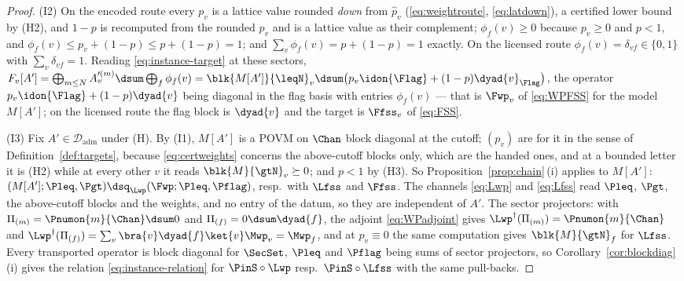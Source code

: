\begin{proof}
(I2) On the encoded route every $p_v$ is a lattice value rounded
\emph{down} from $\hat p_v$ (\eqref{eq:weightroute}, \eqref{eq:latdown}), a
certified lower bound by (H2), and $1-p$ is recomputed from the rounded
$p_v$ and is a lattice value as their complement; $\phi_f(v)\ge0$ because
$p_v\ge0$ and $p<1$, and $\phi_f(v)\le p_v+(1-p)\le p+(1-p)=1$; and
$\sum_v\phi_f(v)=p+(1-p)=1$ exactly. On the licensed route
$\phi_f(v)=\delta_{vf}\in\{0,1\}$ with $\sum_v\delta_{vf}=1$. Reading
\eqref{eq:instance-target} at these sectors,
$F_v[A']=\bigoplus_{m\le N}A'^{(m)}_v\dsum\bigoplus_{f}\phi_f(v)
=\blk{M[A']}{\leqN}_v\dsum\big(p_v\idon{\Flag}+(1-p)\dyad{v}_{\Flag}\big)$,
the operator $p_v\idon{\Flag}+(1-p)\dyad{v}$ being diagonal in the flag basis
with entries $\phi_f(v)$ --- that is $\Fwp_v$ of \eqref{eq:WPFSS} for the
model $M[A']$; on the licensed route the flag block is $\dyad{v}$ and the
target is $\Ffss_v$ of \eqref{eq:FSS}.

(I3) Fix $A'\in\mathcal{D}_{\mathrm{adm}}$ under (H). By (I1), $M[A']$ is a
POVM on $\Chan$ block diagonal at the cutoff; $(p_v)$ are 
for it in the sense of Definition~\ref{def:targets}, because
\eqref{eq:certweights} concerns the above-cutoff blocks only, which are the
handed ones, and at a bounded letter it is (H2) while at every other $v$ it
reads $\blk{M}{\gtN}_v\succeq0$; and $p<1$ by (H3). So
Proposition~\ref{prop:chain}\,(i) applies to $M[A']$:
$(M[A'];\Pleq,\Pgt)\dsq_{\Lwp}(\Fwp;\Pleq,\Pflag)$, resp.\ with $\Lfss$ and
$\Ffss$. The channels \eqref{eq:Lwp} and \eqref{eq:Lfss} read $\Pleq$,
$\Pgt$, the above-cutoff blocks and the weights, and no entry of the datum,
so they are independent of $A'$. The sector projectors: with
$\Pi_{(m)}=\Pnumon{m}{\Chan}\dsum0$ and $\Pi_{(f)}=0\dsum\dyad{f}$, the adjoint
\eqref{eq:WPadjoint} gives $\Lwp^{\dagger}(\Pi_{(m)})=\Pnumon{m}{\Chan}$ and
$\Lwp^{\dagger}(\Pi_{(f)})=\sum_v\bra{v}\dyad{f}\ket{v}\Mwp_v=\Mwp_f$, and at
$p_v\equiv0$ the same computation gives $\blk{M}{\gtN}_f$ for $\Lfss$. Every
transported operator is block diagonal for $\SecSet$, $\Pleq$ and $\Pflag$
being sums of sector projectors, so Corollary~\ref{cor:blockdiag}\,(i) gives
the relation \eqref{eq:instance-relation} for $\PinS\circ\Lwp$ resp.\
$\PinS\circ\Lfss$ with the same pull-backs.


\end{proof}
